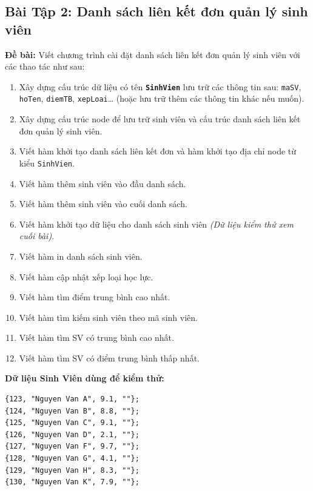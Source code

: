\documentclass[12pt,a4paper]{article}
\begin{document}
\subsection{Bài Tập 2: Danh sách liên kết đơn quản lý sinh viên}
\textbf{Đề bài:} Viết chương trình cài đặt danh sách liên kết đơn quản lý sinh viên với các thao tác như sau:
\begin{enumerate}[itemsep=0.15em]
    \item Xây dựng cấu trúc dữ liệu có tên \textbf{\color{addrcolor}\texttt{SinhVien}} lưu trữ các thông tin sau: \texttt{maSV}, \texttt{hoTen}, \texttt{diemTB}, \texttt{xepLoai}\dots{} (hoặc lưu trữ thêm các thông tin khác nếu muốn).
    \item Xây dựng cấu trúc node để lưu trữ sinh viên và cấu trúc danh sách liên kết đơn quản lý sinh viên.
    \item Viết hàm khởi tạo danh sách liên kết đơn và hàm khởi tạo địa chỉ node từ kiểu \texttt{SinhVien}.
    \item Viết hàm thêm sinh viên vào đầu danh sách.
    \item Viết hàm thêm sinh viên vào cuối danh sách.
    \item Viết hàm khởi tạo dữ liệu cho danh sách sinh viên \textit{(Dữ liệu kiểm thử xem cuối bài)}.
    \item Viết hàm in danh sách sinh viên.
    \item Viết hàm cập nhật xếp loại học lực.
    \item Viết hàm tìm điểm trung bình cao nhất.
    \item Viết hàm tìm kiếm sinh viên theo mã sinh viên.
    \item Viết hàm tìm SV có trung bình cao nhất.
    \item Viết hàm tìm SV có điểm trung bình thấp nhất.
\end{enumerate}

\needspace{5.5cm}
\noindent\textbf{Dữ liệu Sinh Viên dùng để kiểm thử:}
\begin{lstlisting}[numbers=none]
{123, "Nguyen Van A", 9.1, ""};
{124, "Nguyen Van B", 8.8, ""};
{125, "Nguyen Van C", 9.1, ""};
{126, "Nguyen Van D", 2.1, ""};
{127, "Nguyen Van F", 9.7, ""};
{128, "Nguyen Van G", 4.1, ""};
{129, "Nguyen Van H", 8.3, ""};
{130, "Nguyen Van K", 7.9, ""};
\end{lstlisting}
\end{document}
